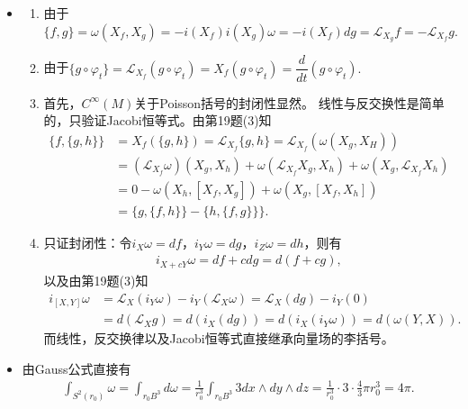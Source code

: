 \begin{itemize}
\item[20.] 
\begin{enumerate}
    \item[(1)] 
    由于$\{f,g\}=\omega(X_{f},X_{g})=-i(X_{f})i(X_{g})\omega=-i(X_{f})dg=\mathscr{L}_{X_{g}}f=-\mathscr{L}_{X_{f}}g.$
    \item[(2)] 
    由于$\{g\circ \varphi_{t}\} = \mathscr{L}_{X_{f}}(g\circ \varphi_{t}) = X_{f}(g \circ \varphi_{t}) = \dfrac{d}{dt}(g\circ \varphi_{t}).$
    \item[(3)] 
    首先，$C^{\infty}(M)$关于Poisson括号的封闭性显然。
    线性与反交换性是简单的，只验证Jacobi恒等式。由第19题(3)知
    \begin{equation*}\begin{aligned}
        \{f,\{g,h\}\} &= X_{f}(\{g,h\}) = \mathscr{L}_{X_{f}}\{g,h\} = \mathscr{L}_{X_{f}}(\omega(X_{g},X_{H})) \\
        &= (\mathscr{L}_{X_{f}}\omega)(X_{g},X_{h}) + \omega(\mathscr{L}_{X_{f}}X_{g},X_{h}) + \omega(X_{g},\mathscr{L}_{X_{f}}X_{h}) \\
        &= 0 - \omega(X_{h},[X_{f},X_{g}]) + \omega(X_{g},[X_{f},X_{h}]) \\
        &= \{g,\{f,h\}\} - \{h,\{f,g\}\}\} .
    \end{aligned}\end{equation*}
    \item[(4)] 
    只证封闭性：令$i_{X}\omega=df$，$i_{Y}\omega=dg$，$i_{Z}\omega=dh$，则有
    \begin{equation*}\begin{aligned}
        i_{X+cY}\omega=df + cdg=d(f+cg),
    \end{aligned}\end{equation*}
    以及由第19题(3)知
    \begin{equation*}\begin{aligned}
        i_{[X,Y]}\omega &= \mathscr{L}_{X}(i_{Y}\omega) - i_{Y}(\mathscr{L}_{X}\omega) = \mathscr{L}_{X}(dg)-i_{Y}(0) \\
        &= d(\mathscr{L}_{X}g) = d(i_{X}(dg))=d(i_{X}(i_{Y}\omega)) = d(\omega(Y,X)).
    \end{aligned}\end{equation*}
    而线性，反交换律以及Jacobi恒等式直接继承向量场的李括号。
\end{enumerate}

\item[21.] 
    由Gauss公式直接有
    \begin{equation*}
        \begin{aligned}
        \int_{S^{2}(r_{0})}\omega = \int_{r_{0}B^{3}}d\omega = \frac{1}{r_{0}^{3}}\int_{r_{0}B^{3}}3dx\wedge dy \wedge dz = \frac{1}{r_{0}^{3}}\cdot 3 \cdot \frac{4}{3}\pi r_{0}^{3}=4\pi.
        \end{aligned}
    \end{equation*}


\end{itemize}
